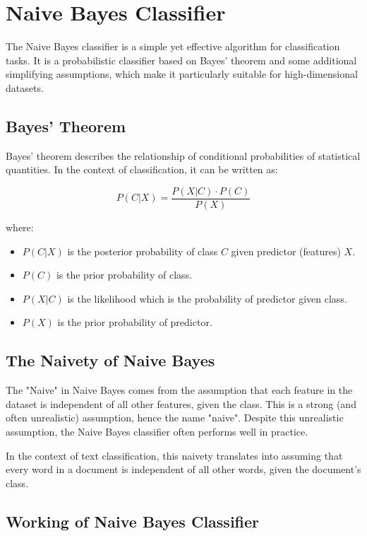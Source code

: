 \chapter{Naive Bayes Classifier}

The Naive Bayes classifier is a simple yet effective algorithm for
classification tasks. It is a probabilistic classifier based on Bayes'
theorem and some additional simplifying assumptions, which make it
particularly suitable for high-dimensional datasets.

\section{Bayes' Theorem}

Bayes' theorem describes the relationship of conditional probabilities
of statistical quantities. In the context of classification, it can be
written as:

\begin{equation*}
P(C|X) = \frac{P(X|C) \cdot P(C)}{P(X)}
\end{equation*}

where:
\begin{itemize}
\item $P(C|X)$ is the posterior probability of class $C$ given predictor (features) $X$.
\item $P(C)$ is the prior probability of class.
\item $P(X|C)$ is the likelihood which is the probability of predictor given class.
\item $P(X)$ is the prior probability of predictor.
\end{itemize}

\section{The Naivety of Naive Bayes}

The "Naive" in Naive Bayes comes from the assumption that each feature
in the dataset is independent of all other features, given the
class. This is a strong (and often unrealistic) assumption, hence the
name "naive". Despite this unrealistic assumption, the Naive Bayes
classifier often performs well in practice.

In the context of text classification, this naivety translates into
assuming that every word in a document is independent of all other
words, given the document's class.

\section{Working of Naive Bayes Classifier}

